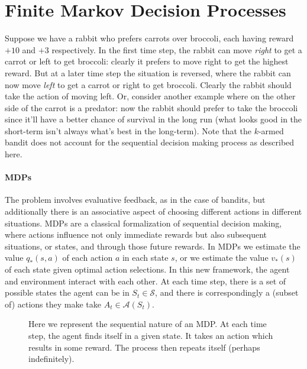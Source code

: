 \documentclass[12pt]{article}
\begin{document}
\section{Finite Markov Decision Processes}
Suppose we have a rabbit who prefers carrots over broccoli, each having reward $+10$ and $+3$ respectively. In the first time step, the rabbit can move \emph{right} to get a carrot or left to get broccoli: clearly it prefers to move right to get the highest reward. But at a later time step the situation is reversed, where the rabbit can now move \emph{left} to get a carrot or right to get broccoli. Clearly the rabbit should take the action of moving left. Or, consider another example where on the other side of the carrot is a predator: now the rabbit should prefer to take the broccoli since it'll have a better chance of survival in the long run (what looks good in the short-term isn't always what's best in the long-term). Note that the $k$-armed bandit does not account for the sequential decision making process as described here.

\paragraph{MDPs}
The problem involves evaluative feedback, as in the case of bandits, but additionally there is an associative aspect of choosing different actions in different situations.  MDPs are a classical formalization of sequential decision making, where actions influence not only immediate rewards but also subsequent situations, or states, and through those future rewards. In MDPs we estimate the value $q_*(s,a)$ of each action $a$ in each state $s$, or we estimate the value
$v_*(s)$ of each state given optimal action selections. In this new framework, the agent and environment interact with each other. At each time step, there is a set of possible states the agent can be in $S_t \in \mathcal S$, and there is correspondingly a (subset of) actions they make take $A_t \in \mathcal A(S_t)$.

\begin{figure}[h]
  \centering
\caption{\footnotesize Here we represent the sequential nature of an MDP. At each time step, the agent finds itself in a given state. It takes an action which results in some reward. The process then repeats itself (perhaps indefinitely).}
\end{figure}
\end{document}
